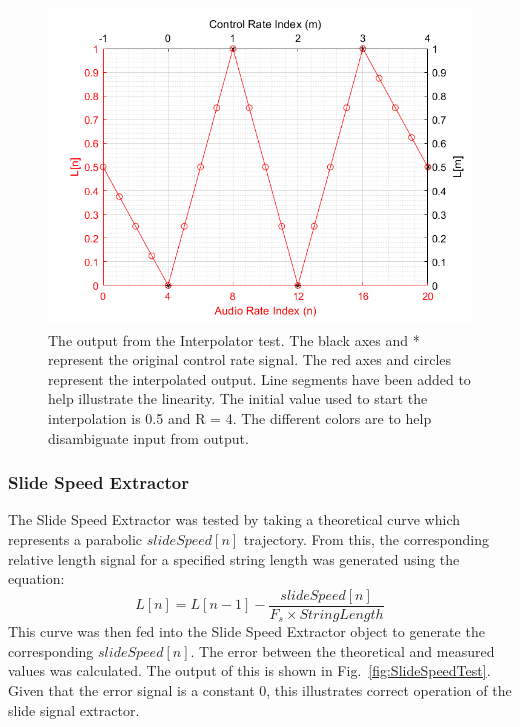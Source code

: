 \documentclass[../main.tex]{subfiles}
\begin{document}
\begin{figure}[h]
    \centering
    \includegraphics[scale=.65]{./images/plots/InterpolatorTest.png}
    \caption{The output from the Interpolator test. The black axes and * represent the original control rate signal. The red axes and circles represent the interpolated output. Line segments have been added to help illustrate the linearity. The initial value used to start the interpolation is 0.5 and R = 4. The different colors are to help disambiguate input from output.}
    \label{fig:InterpTest}
\end{figure}

\subsubsection{Slide Speed Extractor}
\label{sec:SSE_test}
The Slide Speed Extractor was tested by taking a theoretical curve which represents a parabolic $slideSpeed[n]$ trajectory. From this, the corresponding relative length signal for a specified string length was generated using the equation:
\begin{equation}
    L[n] = L[n-1] - \frac{slideSpeed[n]}{F_s \times StringLength}
\end{equation}
This curve was then fed into the Slide Speed Extractor object to generate the corresponding $slideSpeed[n]$. The error between the theoretical and measured values was calculated. The output of this is shown in Fig.~\ref{fig:SlideSpeedTest}. Given that the error signal is a constant 0, this illustrates correct operation of the slide signal extractor.
\end{document}

